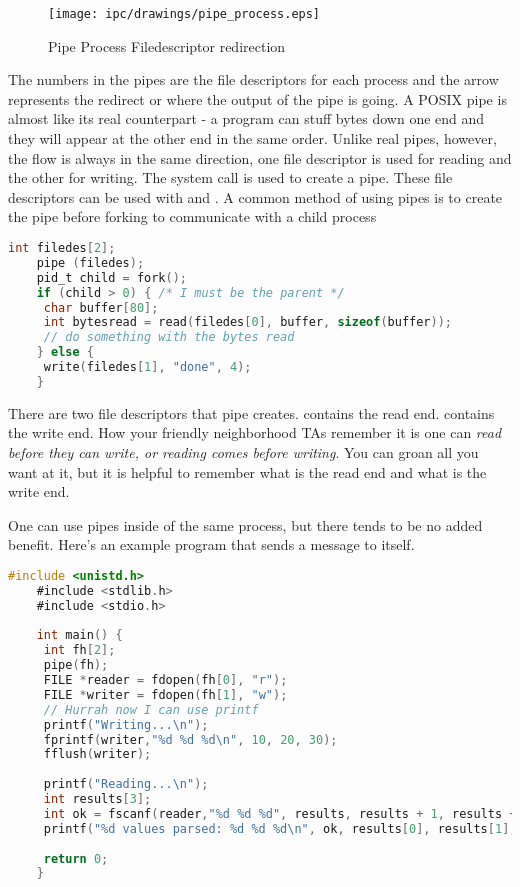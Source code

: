 \begin{figure}[H]
	\centering
	\texttt{[image: ipc/drawings/pipe\_process.eps]}
	\caption{Pipe Process Filedescriptor redirection}
\end{figure}
	 
The numbers in the pipes are the file descriptors for each process and the arrow represents the redirect or where the output of the pipe is going.
A POSIX pipe is almost like its real counterpart - a program can stuff bytes down one end and they will appear at the other end in the same order.
Unlike real pipes, however, the flow is always in the same direction, one file descriptor is used for reading and the other for writing.
The  system call is used to create a pipe.
These file descriptors can be used with  and .
A common method of using pipes is to create the pipe before forking to communicate with a child process
	 
\begin{lstlisting}[language=C]
	int filedes[2];
	pipe (filedes);
	pid_t child = fork();
	if (child > 0) { /* I must be the parent */
	 char buffer[80];
	 int bytesread = read(filedes[0], buffer, sizeof(buffer));
	 // do something with the bytes read
	} else {
	 write(filedes[1], "done", 4);
	}
\end{lstlisting}
	 
There are two file descriptors that pipe creates.
 contains the read end.
 contains the write end.
How your friendly neighborhood TAs remember it is one can \textit{read before they can write, or reading comes before writing}.
You can groan all you want at it, but it is helpful to remember what is the read end and what is the write end.
	 
One can use pipes inside of the same process, but there tends to be no added benefit.
Here's an example program that sends a message to itself.
	 
\begin{lstlisting}[language=C]
	#include <unistd.h>
	#include <stdlib.h>
	#include <stdio.h>
	 
	int main() {
	 int fh[2];
	 pipe(fh);
	 FILE *reader = fdopen(fh[0], "r");
	 FILE *writer = fdopen(fh[1], "w");
	 // Hurrah now I can use printf
	 printf("Writing...\n");
	 fprintf(writer,"%d %d %d\n", 10, 20, 30);
	 fflush(writer);
	 
	 printf("Reading...\n");
	 int results[3];
	 int ok = fscanf(reader,"%d %d %d", results, results + 1, results + 2);
	 printf("%d values parsed: %d %d %d\n", ok, results[0], results[1], results[2]);
	 
	 return 0;
	}
\end{lstlisting}
	 

